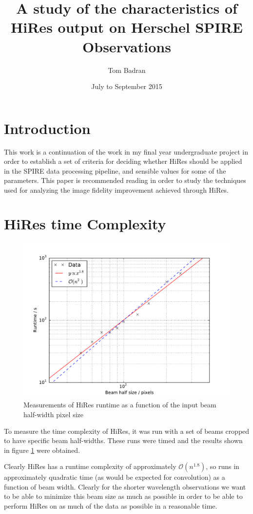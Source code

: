 \documentclass[a4paper]{article}
\title{{A study of the characteristics of HiRes output on Herschel SPIRE Observations}}
\author{Tom Badran}
\date{July to September 2015}
\providecommand{\bigo}[1]{\mathcal{O}\left( #1 \right)}
\numberwithin{equation}{section}
\begin{document}
\maketitle

\section{Introduction}

This work is a continuation of the work in my final year undergraduate project \cite{badran} in order to establish a set of criteria for deciding whether HiRes should be applied in the SPIRE data processing pipeline, and sensible values for some of the parameters. This paper is recommended reading in order to study the techniques used for analyzing the image fidelity improvement achieved through HiRes.

\section{HiRes time Complexity}

\begin{figure}[H]
    \centering
    \includegraphics[width=0.85\linewidth]{runtime.pdf}
    \caption{Measurements of HiRes runtime as a function of the input beam half-width pixel size}
    \label{hrtc}
\end{figure}

To measure the time complexity of HiRes, it was run with a set of beams cropped to have specific beam half-widths. These runs were timed and the results shown in figure \ref{hrtc} were obtained.

Clearly HiRes has a runtime complexity of approximately $\bigo{n^{1.8}}$, so runs in approximately quadratic time (as would be expected for convolution) as a function of beam width. Clearly for the shorter wavelength observations we want to be able to minimize this beam size as much as possible in order to be able to perform HiRes on as much of the data as possible in a reasonable time.
\end{document}
